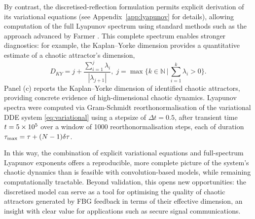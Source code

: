 %
By contrast, the discretised-reflection formulation permits explicit derivation of its variational equations (see Appendix~\ref{app:lyapunov} for details), allowing computation of the full Lyapunov spectrum using standard methods such as the approach advanced by Farmer \cite{farmer1982chaotic}.
This complete spectrum enables stronger diagnostics: for example, the Kaplan–Yorke dimension \cite{frederickson1983liapunov} provides a quantitative estimate of a chaotic attractor's dimension, 
%
\begin{equation}
    \label{eq:kaplan_yorke}
    D_{KY} = j + \frac{\sum_{i=1}^{j} \lambda_i}{|\lambda_{j+1}|}, \; j = \max\{k \in \mathbb{N} \,|\, \sum_{i=1}^{k} \lambda_i > 0\}.
\end{equation}
%
Panel (c) reports the Kaplan–Yorke dimension of identified chaotic attractors, providing concrete evidence of high-dimensional chaotic dynamics.
Lyapunov spectra were computed via Gram-Schmidt reorthonormalisation of the variational DDE system \eqref{eq:variational} using a stepsize of $\Delta t = 0.5$, after transient time $t = 5\times 10^{5}$ over a window of 1000 reorthonormalisation steps, each of duration $\tau_\text{max}=\tau+(N-1)\delta \tau$.
%
\par
%
In this way, the combination of explicit variational equations and full-spectrum Lyapunov exponents offers a reproducible, more complete picture of the system's chaotic dynamics than is feasible with convolution-based models, while remaining computationally tractable.
Beyond validation, this opens new opportunities: the discretised model can serve as a tool for optimising the quality of chaotic attractors generated by FBG feedback in terms of their effective dimension, an insight with clear value for applications such as secure signal communications.
%
%
